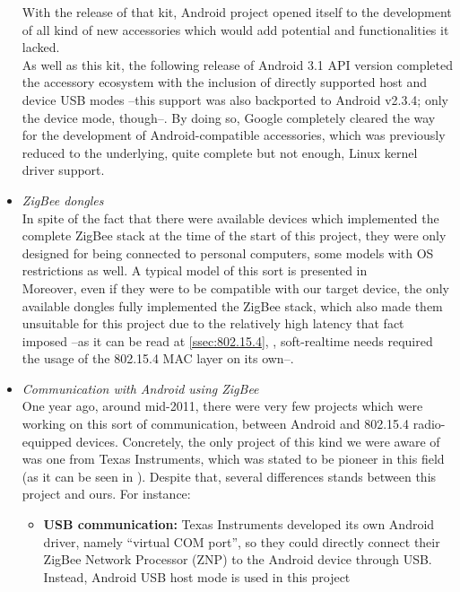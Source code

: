 \begin{itemize}
				With the release of that kit, Android project opened itself to the development
				of all kind of new accessories which would add potential and functionalities
				it lacked.\\

				As well as this kit, the following release of Android 3.1 API version completed
				the accessory ecosystem with the inclusion of directly supported host and device
				USB modes --this support was also backported to Android v2.3.4; only the device mode, though--.
				By doing so, Google completely cleared the way for the development of Android-compatible accessories, 
				which was previously reduced to the underlying, quite complete but not enough, Linux kernel driver 
				support.\\
			\item \emph{ZigBee dongles}\\
				In spite of the fact that there were available devices which implemented the complete ZigBee
				stack at the time of the start of this project, they were only designed for being connected to
				personal computers, some models with OS restrictions as well. A typical model of this sort is
				presented in \cite{dongle}\\
				Moreover, even if they were to be compatible with our target device, the only available dongles
				fully implemented the ZigBee stack, which also made them unsuitable for this project due to the
				relatively high latency that fact imposed --as it can be read at \autoref{ssec:802.15.4},
				, soft-realtime needs required the usage of the 802.15.4 MAC layer on
				its own--.
			\item \emph{Communication with Android using ZigBee}\\
				One year ago, around mid-2011, there were very few projects which were working on this sort of
				communication, between Android and 802.15.4 radio-equipped devices. Concretely, the only project
				of this kind we were aware of was one from Texas Instruments, which was stated to be pioneer in 
				this field (as it can be seen in \cite{articleTI}).
				Despite that, several differences stands between this project and ours. For instance:
				\begin{itemize}
					\item \textbf{USB communication:} Texas Instruments developed its own Android driver, namely
						``virtual COM port'', so they could directly connect their ZigBee Network Processor (ZNP)
						to the Android device through USB. Instead, Android USB host mode is used in this project

\end{itemize}
\end{itemize}
